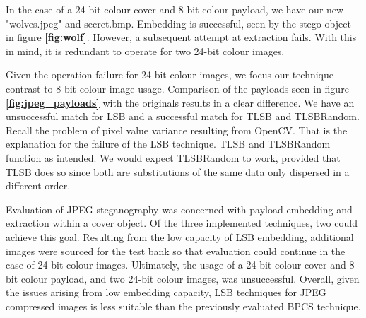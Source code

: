 \documentclass{l4proj}
\begin{document}
In the case of a 24-bit colour cover and 8-bit colour payload, we have our new "wolves.jpeg" and secret.bmp. Embedding is successful, seen by the stego object in figure \textbf{\ref{fig:wolf}}. However, a subsequent attempt at extraction fails. With this in mind, it is redundant to operate for two 24-bit colour images.

Given the operation failure for 24-bit colour images, we focus our technique contrast to 8-bit colour image usage. Comparison of the payloads seen in figure \textbf{\ref{fig:jpeg_payloads}} with the originals results in a clear difference. We have an unsuccessful match for LSB and a successful match for TLSB and TLSBRandom.  Recall the problem of pixel value variance resulting from OpenCV. That is the explanation for the failure of the LSB technique. TLSB and TLSBRandom function as intended.   We would expect TLSBRandom to work, provided that TLSB does so since both are substitutions of the same data only dispersed in a different order.

Evaluation of JPEG steganography was concerned with payload embedding and extraction within a cover object. Of the three implemented techniques, two could achieve this goal. Resulting from the low capacity of LSB embedding, additional images were sourced for the test bank so that evaluation could continue in the case of 24-bit colour images. Ultimately, the usage of a 24-bit colour cover and 8-bit colour payload, and two 24-bit colour images, was unsuccessful. Overall, given the issues arising from low embedding capacity, LSB techniques for JPEG compressed images is less suitable than the previously evaluated BPCS technique.
\end{document}
